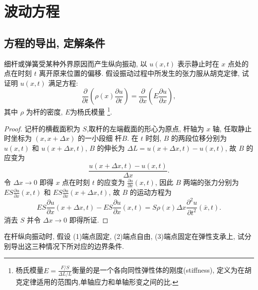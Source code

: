 \chapter{波动方程}

\section{方程的导出, 定解条件}


\begin{exercise}
  细杆或弹簧受某种外界原因而产生纵向振动, 
  以 $u(x,t)$ 表示静止时在 $x$ 点处的点在时刻 $t$ 离开原来位置的偏移.
  假设振动过程中所发生的张力服从胡克定律, 试证明 $u(x,t)$ 满足方程:
  \[\frac{\partial}{\partial t}\left(\rho(x)\frac{\partial u}{\partial t}\right)
    = \frac{\partial}{\partial x}\left(E\frac{\partial u}{\partial x}\right),\]
  其中 $\rho$ 为杆的密度, $E$为杨氏模量%
  \footnote{杨氏模量$E=\frac{F/S}{\Delta L/L}$衡量的是一个各向同性弹性体的刚度(stiffness),
    定义为在胡克定律适用的范围内,单轴应力和单轴形变之间的比.}.
\end{exercise}

\begin{proof}
  记杆的横截面积为 $S$,取杆的左端截面的形心为原点, 杆轴为 $x$ 轴,
  任取静止时坐标为 $(x,x+\Delta x)$ 的一小段细 杆$B$.
  在 $t$ 时刻, $B$ 的两段位移分别为 $u(x,t)$ 和 $u(x+\Delta x,t)$,
  $B$ 的伸长为 $\Delta L=u(x+\Delta x,t)-u(x,t)$, 故 $B$ 的应变为
  \[\frac{u(x+\Delta x,t)-u(x,t)}{\Delta x}.\]
  令 $\Delta x\to 0$ 即得 $x$ 点在时刻 $t$ 的应变为 $\displaystyle\frac{\partial u}{\partial x}(x,t)$,
  因此 $B$ 两端的张力分别为 $\displaystyle ES\frac{\partial u}{\partial x}(x,t)$
  和 $\displaystyle ES\frac{\partial u}{\partial x}(x+\Delta x,t)$, 故 $B$ 的运动方程为
  \[ES\frac{\partial u}{\partial x}(x+\Delta x,t)-ES\frac{\partial u}{\partial x}(x,t)
    = S\rho(x)\Delta x\frac{\partial^2u}{\partial t^2}(\bar{x},t).\]
  消去 $S$ 并令 $\Delta x\to 0$ 即得所证.
\end{proof}


\begin{exercise}
  在杆纵向振动时, 假设 (1)端点固定, (2)端点自由, (3)端点固定在弹性支承上,
  试分别导出这三种情况下所对应的边界条件.
\end{exercise}

